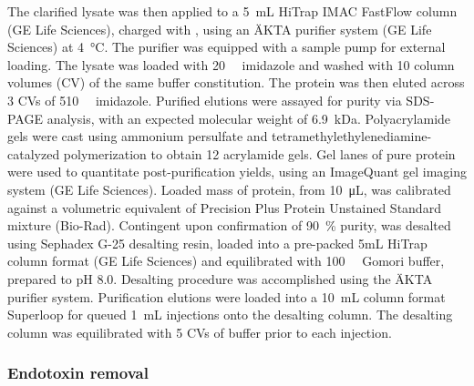 \begin{refsection}
The clarified lysate was then applied to a \SI{5}{\mL} HiTrap IMAC FastFlow
column (GE Life Sciences), charged with , using an \"{A}KTA purifier
system (GE Life Sciences) at \SI{4}{\celsius}. The purifier was equipped with a
sample pump for external loading. The lysate was loaded with
\SI{20}{\milli\moLar} imidazole and washed with 10 column volumes (CV) of the
same buffer constitution. The protein was then eluted across 3 CVs of
\SI{510}{\milli\moLar} imidazole. Purified elutions were assayed for purity via
SDS-PAGE analysis, with an expected molecular weight of \SI{6.9}{\kilo\dalton}.
Polyacrylamide gels were cast using ammonium persulfate and
tetramethylethylenediamine-catalyzed polymerization to obtain \SI{12}{\wtper}
acrylamide gels. Gel lanes of pure protein were used to quantitate
post-purification yields, using an ImageQuant gel imaging system (GE Life
Sciences). Loaded mass of protein, from \SI{10}{\uL}, was calibrated against a
volumetric equivalent of Precision Plus Protein Unstained Standard mixture
(Bio-Rad). Contingent upon confirmation of \SI{90}{\percent} purity, was
desalted using Sephadex G-25 desalting resin, loaded into a pre-packed 5mL
HiTrap column format (GE Life Sciences) and equilibrated with
\SI{100}{\milli\moLar} Gomori buffer, prepared to pH 8.0. Desalting procedure
was accomplished using the \"{A}KTA purifier system. Purification elutions were
loaded into a \SI{10}{\mL} column format Superloop for queued \SI{1}{\mL}
injections onto the desalting column. The desalting column was equilibrated with
5 CVs of buffer prior to each injection.

\subsubsection{Endotoxin removal}


\end{refsection}
